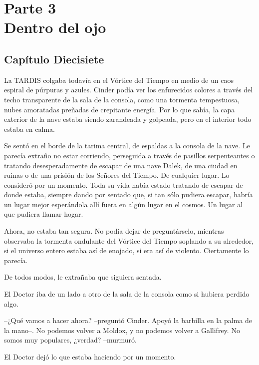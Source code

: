 \part*{Parte 3 \\ \vspace{2 mm} {\large Dentro del ojo}}
\chapter*{Capítulo Diecisiete}



La TARDIS colgaba todavía en el Vórtice del Tiempo en medio de un caos espiral de púrpuras y azules. Cinder podía ver los enfurecidos colores a través del techo transparente de la sala de la consola, como una tormenta tempestuosa, nubes amoratadas preñadas de crepitante energía. Por lo que sabía, la capa exterior de la nave estaba siendo zarandeada y golpeada, pero en el interior todo estaba en calma.

Se sentó en el borde de la tarima central, de espaldas a la consola de la nave. Le parecía extraño no estar corriendo, perseguida a través de pasillos serpenteantes o tratando desesperadamente de escapar de una nave Dalek, de una ciudad en ruinas o de una prisión de los Señores del Tiempo. De cualquier lugar. Lo consideró por un momento. Toda su vida había estado tratando de escapar de donde estaba, siempre dando por sentado que, si tan sólo pudiera escapar, habría un lugar mejor esperándola allí fuera en algún lugar en el cosmos. Un lugar al que pudiera llamar hogar.

Ahora, no estaba tan segura. No podía dejar de preguntárselo, mientras observaba la tormenta ondulante del Vórtice del Tiempo soplando a su alrededor, si el universo entero estaba así de enojado, si era así de violento. Ciertamente lo parecía.

De todos modos, le extrañaba que siguiera sentada.

El Doctor iba de un lado a otro de la sala de la consola como si hubiera perdido algo.



--¿Qué vamos a hacer ahora? --preguntó Cinder. Apoyó la barbilla en la palma de la mano--. No podemos volver a Moldox, y no podemos volver a Gallifrey. No somos muy populares, ¿verdad? --murmuró.



El Doctor dejó lo que estaba haciendo por un momento. 



